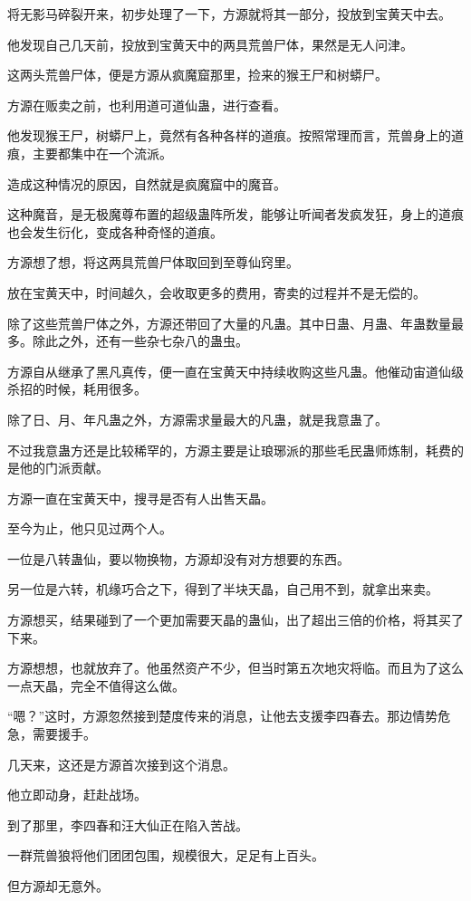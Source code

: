 \begin{this_body}
将无影马碎裂开来，初步处理了一下，方源就将其一部分，投放到宝黄天中去。

他发现自己几天前，投放到宝黄天中的两具荒兽尸体，果然是无人问津。

这两头荒兽尸体，便是方源从疯魔窟那里，捡来的猴王尸和树蟒尸。

方源在贩卖之前，也利用道可道仙蛊，进行查看。

他发现猴王尸，树蟒尸上，竟然有各种各样的道痕。按照常理而言，荒兽身上的道痕，主要都集中在一个流派。

造成这种情况的原因，自然就是疯魔窟中的魔音。

这种魔音，是无极魔尊布置的超级蛊阵所发，能够让听闻者发疯发狂，身上的道痕也会发生衍化，变成各种奇怪的道痕。

方源想了想，将这两具荒兽尸体取回到至尊仙窍里。

放在宝黄天中，时间越久，会收取更多的费用，寄卖的过程并不是无偿的。

除了这些荒兽尸体之外，方源还带回了大量的凡蛊。其中日蛊、月蛊、年蛊数量最多。除此之外，还有一些杂七杂八的蛊虫。

方源自从继承了黑凡真传，便一直在宝黄天中持续收购这些凡蛊。他催动宙道仙级杀招的时候，耗用很多。

除了日、月、年凡蛊之外，方源需求量最大的凡蛊，就是我意蛊了。

不过我意蛊方还是比较稀罕的，方源主要是让琅琊派的那些毛民蛊师炼制，耗费的是他的门派贡献。

方源一直在宝黄天中，搜寻是否有人出售天晶。

至今为止，他只见过两个人。

一位是八转蛊仙，要以物换物，方源却没有对方想要的东西。

另一位是六转，机缘巧合之下，得到了半块天晶，自己用不到，就拿出来卖。

方源想买，结果碰到了一个更加需要天晶的蛊仙，出了超出三倍的价格，将其买了下来。

方源想想，也就放弃了。他虽然资产不少，但当时第五次地灾将临。而且为了这么一点天晶，完全不值得这么做。

“嗯？”这时，方源忽然接到楚度传来的消息，让他去支援李四春去。那边情势危急，需要援手。

几天来，这还是方源首次接到这个消息。

他立即动身，赶赴战场。

到了那里，李四春和汪大仙正在陷入苦战。

一群荒兽狼将他们团团包围，规模很大，足足有上百头。

但方源却无意外。


\end{this_body}
